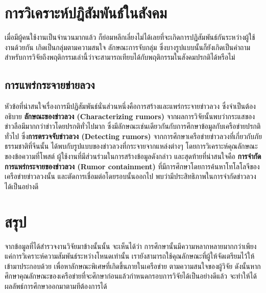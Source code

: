 \section{การวิเคราะห์ปฎิสัมพันธ์ในสังคม}
เมื่อมีผู้คนใช้งานเป็นจำนวนมากแล้ว 
ก็ย่อมหลีกเลี่ยงไม่ได้เลยที่จะเกิดการปฏิสัมพันธ์กันระหว่างผู้ใช้งานด้วยกัน
เกิดเป็นกลุ่มตามความสนใจ ลักษณะการจับกลุ่ม 
ซึ่งบางรูปแบบนั้นก็ยังเกิดเป็นคำถามสำหรับการวิจัยถึงพฤติกรรมเล่านี้ว่าจะสามารถเทียบได้กับพฤติกรรมในสังคมปรกติได้หรือไม่

\subsection{การแพร่กระจายข่ายลวง}
หัวข้อที่น่าสนใจเรื่องการมีปฏิสัมพันธ์นั่นส่วนหนึ่งคือการสร้างและแพร่กระจายข่าวลวง 
ซึ่งจำเป็นต้องอธิบาย \textbf{ลักษณะของข่าวลวง (Characterizing rumors)} 
จากผลการวิจัยนั้นพบว่ากระแสของข่าวลือมีมากกว่าข่าวโดยปรกติทั่วไปมาก 
ซึ่งมีลักษณะเช่นเดียวกันกับการศึกษาข้อมูลกับเครือข่ายปรกติทั่วไป ซึ่ง\textbf{การตรวจจับข่าวลวง (Detecting rumors)}
จากการศึกษาเครือข่ายข่าวลวงที่เกี่ยวกับภัยธรรมชาติที่จีนนั้น 
ได้พบกับรูปแบบของข่าวลวงที่กระจายจากแหล่งต่างๆ 
โดยการวิเคราะห์คุณลักษณะของข้อความที่โพสต์ ผู้ใช้งานที่มีส่วนร่วมในการสร้างข้อมูลดังกล่าว
และสุดท้ายที่น่าสนใจคือ \textbf{การจำกัดการแพร่กระจายของข่าวลวง (Rumor containment)} 
ที่มีการศึกษาโดยการค้นหาโทโลโลจีของเครือข่ายข่าวลวงนั้น และตัดการเชื่อมต่อโดยรอบนั้นออกไป
พบว่ามีประสิทธิภาพในการจำกัดข่าวลวงได้เป็นอย่างดี


\section{สรุป}
จากข้อมูลที่ได้สำรวจงานวิจัยมาข้างนั้นนั้น จะเห็นได้ว่า 
การศึกษา{\OSN}นั้นมีความหลากหลายมากกว่าเพียงแค่การวิเคราะห์ความสัมพันธ์ระหว่างโหนดเท่านั้น
เรายังสามารถใช้คุณลักษณะที่ผู้ให้{\SNS}จัดเตรียมไว้ให้เข้ามาประกอบด้วย 
เพื่อหาลักษณะพิเศษที่เกิดขึ้นภายในเครือข่าย ตามความสนใจของผู้วิจัย 
ดังนั้นหากศึกษาคุณลักษณะของเครือข่ายที่จะศึกษาก่อนแล้วกำหนดกรอบการวิจัยได้เป็นอย่างดีแล้ว 
จะทำให้ได้ผลลัพธ์การศึกษาออกมาตามทีต้องการได้
